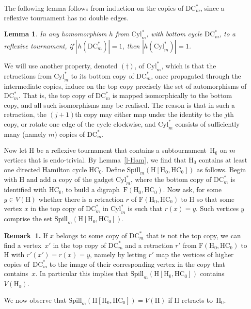 \documentclass[a4paper,12pt]{article}
\newtheorem{lemma}{Lemma}
\theoremstyle{remark}
\newcommand{\HC}[0]{\ensuremath{\mathrm{HC}}}
\newcommand{\DCm}[0]{\ensuremath{\mathrm{DC}^*_m}}
\newcommand{\Cylm}[0]{\ensuremath{\mathrm{Cyl}^*_m}}
\newcommand{\F}{\ensuremath{\mathrm{F}}}
\renewcommand{\H}{\ensuremath{\mathrm{H}}}
\begin{document}
The following lemma follows from induction on the copies of $\DCm$, since a reflexive tournament has no double edges.
\begin{lemma}
In any homomorphism $h$ from $\Cylm$, with bottom cycle $\DCm$, to a reflexive tournament, if $|h(\DCm)|=1$, then $|h(\Cylm)|=1$.
\label{lem:claim1}
\end{lemma}

We will use another property, denoted \textbf{$(\dagger)$}, of $\Cylm$, which is that the retractions from $\Cylm$ to its bottom copy of $\DCm$, once propagated through the intermediate copies, induce on the top copy precisely the set of automorphisms of $\DCm$. That is, the top copy of $\DCm$ is mapped isomorphically to the bottom copy, and all such isomorphisms may be realised.
The reason is that in such a retraction, the $(j+1)$th copy may either map under the identity to the $j$th copy, or rotate one edge of the cycle clockwise, 
and $\Cylm$ consists of sufficiently many (namely $m$) copies of $\DCm$.

Now let $\H$ be a reflexive tournament that contains a subtournament~$\H_0$ on $m$ vertices that is endo-trivial.
By Lemma~\ref{l-Ham}, we find that $\H_0$ contains at least one directed Hamilton cycle $\HC_0$. 
Define $\mathrm{Spill}_m(\H[\H_0,\HC_0])$ as follows. Begin with $\H$ and add a copy of the gadget $\Cylm$, where the bottom copy of $\DCm$ is identified with $\HC_0$, to build a 
digraph~$\F(\H_0,\HC_0)$. Now ask, for some $y \in V(\H)$ whether there is a retraction $r$ of $\F(\H_0,\HC_0)$ to $\H$ so that some vertex $x$ in the top copy of $\DCm$ in $\Cylm$ is such that $r(x)=y$. Such vertices $y$ comprise the set $\mathrm{Spill}_m(\H[\H_0,\HC_0])$.

\medskip
\noindent
{\bf Remark~1.}
If $x$ belongs to some copy of $\DCm$ that is not the top copy, we can find a vertex~$x'$ in the top copy of $\DCm$ and a retraction $r'$ from $\F(\H_0,\HC_0)$ to $\H$ with $r'(x')=r(x)=y$, namely by letting $r'$ map the vertices of higher copies of~$\DCm$ to the image of their corresponding vertex in the copy that contains~$x$. In particular this implies that $\mathrm{Spill}_m(\H[\H_0,\HC_0])$ contains $V(\H_0)$.

\medskip
\noindent
We now observe that $\mathrm{Spill}_m(\H[\H_0,\HC_0])=V(\H)$ if $\H$ retracts to~$\H_0$.
\end{document}
